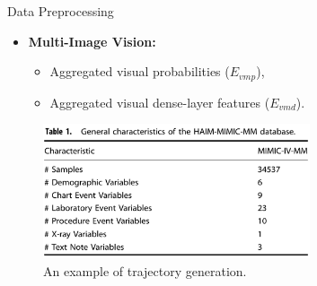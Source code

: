 \documentclass{sintefbeamer}
\theoremstyle{definition}
\begin{document}
\begin{frame}{Data Preprocessing}
\small
\begin{itemize}
    
    \item \textbf{Multi-Image Vision:} 
    \begin{itemize}
        \item Aggregated visual probabilities (\(E_{vmp}\)),
        \item Aggregated visual dense-layer features (\(E_{vmd}\)).
    \end{itemize}
\end{itemize}
\begin{figure}[htbp]
  \centering
  \includegraphics[width=0.7\textwidth]{images/table1}
  \caption{\scriptsize An example of trajectory generation.}
  \label{fig:ex1}	
\end{figure}
\end{frame}
\end{document}
